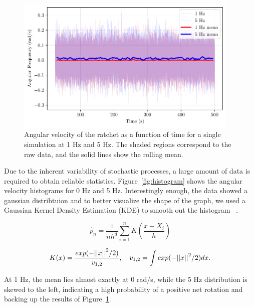 \begin{figure}[h!]
\begin{center}
\includegraphics[width=0.95\textwidth]{figures/time_series.pdf}
\end{center}
\caption[Angular frequency as a function of time.]
{Angular velocity of the ratchet as a function of time for a single simulation at 1 Hz and 5 Hz. The shaded regions correspond to the raw data, and the solid lines show the rolling mean.}
\label{fig:velocityvstime}
\end{figure}

Due to the inherent variability of stochastic processes, a large amount of data is required to obtain reliable statistics. Figure~\ref{fig:histogram} shows the angular velocity histograms for 0 Hz and 5 Hz. Interestingly enough, the data showed a gaussian distribtuion and to better visualize the shape of the graph, we used a Gaussian Kernel Density Estimation (KDE) to smooth out the histogram ~\cite{chen2017tutorial}. 

\begin{equation}
  \hat{p}_n = \frac{1}{nh^d} \displaystyle\sum_{i=1}^{n}K \left(\frac{x - X_i}{h}\right)
  \label{eq:kde}
\end{equation}

\begin{equation}
  K(x) = \frac{exp(-\abs{\abs{x}}^2/2)}{v_{1,2}}, \quad v_{1,2} = \displaystyle\int exp(-\abs{\abs{x}}^2/2)dx.
  \label{eq:gaussiankernel}
\end{equation}

At 1 Hz, the mean lies almost exactly at 0 rad/s, while the 5 Hz distribution is skewed to the left, indicating a high probability of a positive net rotation and backing up the results of Figure~\ref{fig:velocityvstime}. 


